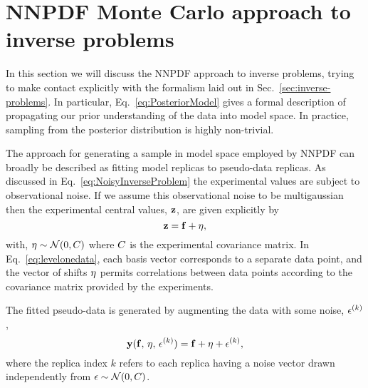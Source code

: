 \section{NNPDF Monte Carlo approach to inverse problems}
\label{sec:closure-test}

In this section we will discuss the NNPDF approach to inverse problems, trying
to make contact explicitly with the formalism laid out in
Sec.~\ref{sec:inverse-problems}. In particular, Eq.~\eqref{eq:PosteriorModel}
gives a formal description of propagating our prior understanding of the data
into model space. In practice, sampling from the posterior distribution is
highly non-trivial.

The approach for generating a sample in model space employed by NNPDF can
broadly be described as fitting model replicas to pseudo-data replicas. As
discussed in Eq.~\eqref{eq:NoisyInverseProblem} the experimental values are
subject to observational noise. If we assume this observational noise to be
multigaussian then the experimental central values, $\mathbf{z}$, are given
explicitly by
\begin{equation}
    \label{eq:levelonedata}
    \mathbf{z} = \mathbf{f} + \mathbf{\eta},
\end{equation}
with, $\mathbf{\eta} \sim \mathcal{N}(0, C)$ where $C$ is the experimental
covariance matrix. In Eq.~\eqref{eq:levelonedata}, each basis vector corresponds
to a separate data point, and the vector of shifts $\mathbf{\eta}$ permits
correlations between data points according to the covariance matrix provided by
the experiments. 

The fitted pseudo-data is generated by augmenting the data with some
noise, $\epsilon^{(k)}$,
\begin{equation}
    \label{eq:leveltwodata1}
    \mathbf{y}(\mathbf{f},\,\mathbf{\eta},\,\mathbf{\epsilon}^{(k)})
    = \mathbf{f} + \mathbf{\eta} + \mathbf{\epsilon}^{(k)},
\end{equation}
where the replica index $k$ refers to each replica having a noise vector drawn
independently from $\mathbf{\epsilon} \sim \mathcal{N}(0, C)$.

